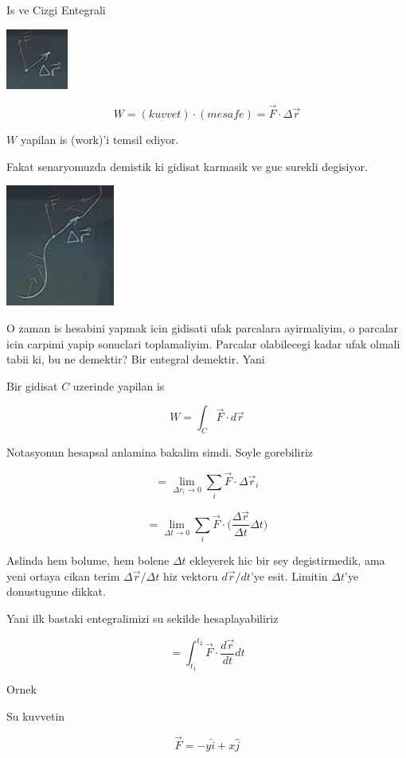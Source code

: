 \documentclass[12pt,fleqn]{article}\usepackage{../common}
\begin{document}
Is ve Cizgi Entegrali

\includegraphics[height=2cm]{19_8.png}

\[ W = (kuvvet)\cdot(mesafe) = \vec{F}\cdot\Delta\vec{r} \]

$W$ yapilan is (work)'i temsil ediyor. 

Fakat senaryomuzda demistik ki gidisat karmasik ve guc surekli
degisiyor.

\includegraphics[height=4cm]{19_9.png}

O zaman is hesabini yapmak icin gidisati ufak parcalara ayirmaliyim, o
parcalar icin carpimi yapip sonuclari toplamaliyim. Parcalar olabilecegi
kadar ufak olmali tabii ki, bu ne demektir? Bir entegral demektir. Yani

Bir gidisat $C$ uzerinde yapilan is 

\[ W = \int_C \vec{F} \cdot d\vec{r} \]

Notasyonun hesapsal anlamina bakalim simdi. Soyle gorebiliriz

\[ = \lim_{\Delta r_i \to 0} \sum_i  \vec{F} \cdot \Delta\vec{r}_i\]

\[ = 
\lim_{\Delta t \to 0} \sum_i  
\vec{F} \cdot \bigg( \frac{\Delta\vec{r}}{\Delta t} \Delta t 
\bigg)
\]

Aslinda hem bolume, hem bolene $\Delta t$ ekleyerek hic bir sey
degistirmedik, ama yeni ortaya cikan terim $\Delta\vec{r} / \Delta t$ hiz
vektoru $d\vec{r}/dt$'ye esit. Limitin $\Delta t$'ye donustugune dikkat.

Yani ilk bastaki entegralimizi su sekilde hesaplayabiliriz

\[ = \int_{t_1}^{t_2} \vec{F} \cdot \frac{d\vec{r}}{dt} dt \]

Ornek

Su kuvvetin

\[ \vec{F} = -y\hat{i} + x\hat{j} \]
\end{document}
